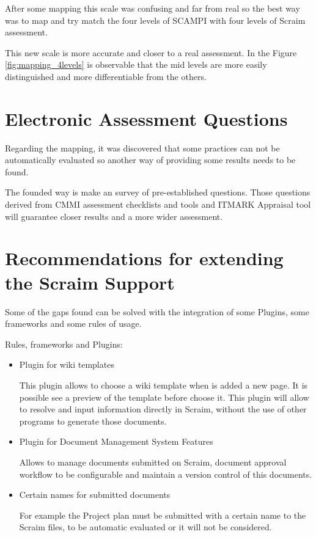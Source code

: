 After some mapping this scale was confusing and far from real so the best way was to map and try match the four levels of SCAMPI with four levels of Scraim assessment.

This new scale is more accurate and closer to a real assessment. In the Figure \ref{fig:mapping_4levels} is observable that the mid levels are more easily distinguished and more differentiable from the others. 

\section{Electronic Assessment Questions} \label{sec:question}

Regarding the mapping, it was discovered  that some practices can not be automatically evaluated so another way of providing some results needs to be found.

The founded way is make an survey of pre-established questions. Those questions derived from CMMI assessment checklists and tools and ITMARK Appraisal tool will guarantee closer results and a more wider assessment.

\section{Recommendations for extending the Scraim Support}

Some of the gaps found can be solved with the integration of some Plugins, some frameworks and some rules of usage.

Rules, frameworks and Plugins:
\begin{itemize}
	\item Plugin for wiki templates
	
	This plugin allows to choose a wiki template when is added a new page. It is possible see a preview of the template before choose it.
	This plugin will allow to resolve and input information directly in Scraim, without the use of other programs to generate those documents.
	
	\item Plugin for Document Management System Features
	
	Allows to manage documents submitted on Scraim, document approval workflow to be configurable and maintain a version control of this documents.
	
	\item Certain names for submitted documents
	
	For example the Project plan must be submitted with a certain name to the Scraim files, to be automatic evaluated or it will not be considered.
	
\end{itemize}